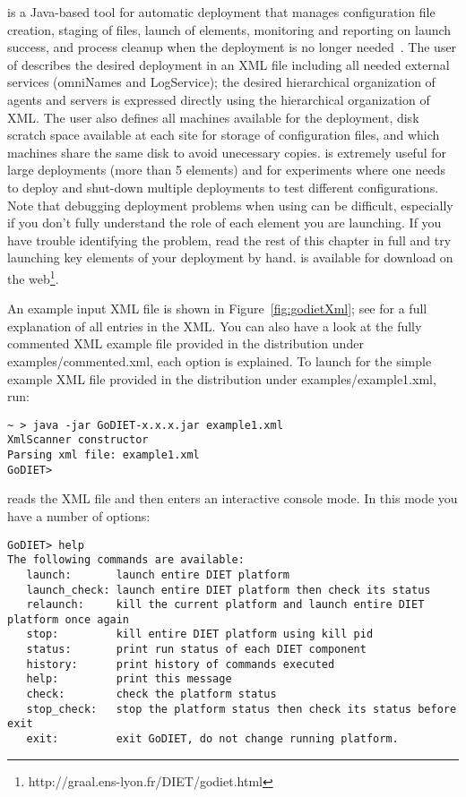 \godiet is a Java-based tool for automatic \diet deployment that manages
configuration file creation, staging of files, launch of elements, monitoring
and reporting on launch success, and process cleanup when the \diet deployment
is no longer needed~\cite{CDa05}. The user of \godiet describes the desired
deployment in an XML file including all needed external services (\eg omniNames
and LogService); the desired hierarchical organization of agents and servers is
expressed directly using the hierarchical organization of XML. The user also
defines all machines available for the deployment, disk scratch space available
at each site for storage of configuration files, and which machines share the
same disk to avoid unecessary copies. \godiet is extremely useful for large
deployments (\eg more than 5 elements) and for experiments where one needs to
deploy and shut-down multiple deployments to test different
configurations. Note that debugging deployment problems when using \godiet can
be difficult, especially if you don't fully understand the role of each element
you are launching. If you have trouble identifying the problem, read the rest
of this chapter in full and try launching key elements of your deployment by
hand. \godiet is available for download on the
web\footnote{http://graal.ens-lyon.fr/DIET/godiet.html}.

An example input XML file is shown in Figure~\ref{fig:godietXml}; see
\cite{CDa05} for a full explanation of all entries in the XML. You can also
have a look at the fully commented XML example file provided in the \godiet
distribution under examples/commented.xml, each option is explained. To launch
\godiet for the simple example XML file provided in the \godiet distribution
under examples/example1.xml, run:

\begin{verbatim}
~ > java -jar GoDIET-x.x.x.jar example1.xml
XmlScanner constructor
Parsing xml file: example1.xml
GoDIET>
\end{verbatim}

\godiet reads the XML file and then enters an interactive console mode. In this
mode you have a number of options:

\begin{verbatim}
GoDIET> help
The following commands are available:
   launch:       launch entire DIET platform
   launch_check: launch entire DIET platform then check its status
   relaunch:     kill the current platform and launch entire DIET platform once again
   stop:         kill entire DIET platform using kill pid
   status:       print run status of each DIET component
   history:      print history of commands executed
   help:         print this message
   check:        check the platform status
   stop_check:   stop the platform status then check its status before exit
   exit:         exit GoDIET, do not change running platform.
\end{verbatim}

